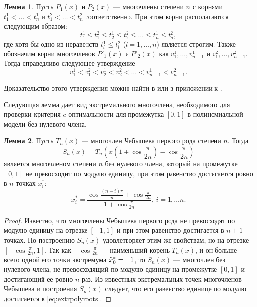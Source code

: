 \documentclass[specialist,
               substylefile = spbu.rtx,
               subf,href,colorlinks=true, 12pt]{disser}
\theoremstyle{definition}
\newtheorem{lemma}{Лемма}
\newcommand{\hm}[1]{#1\nobreak\discretionary{}{\hbox{\ensuremath{#1}}}{}}
\begin{document}
  \begin{lemma}
  \label{lemma:droots}
  	Пусть $P_1(x)$ и $P_2(x)$ --- многочлены степени $n$ с корнями $t^1_1 < \ldots < t^1_n$ и $t^2_1 < \ldots < t^2_n$ соответственно. При этом корни располагаются следующим образом:
  	\begin{equation*}
  		t^1_1 \leqslant t^2_1 \leqslant t^1_2 \leqslant t^2_2 \leqslant \ldots \leqslant t^1_n \leqslant t^2_n,
  	\end{equation*}
  	где хотя бы одно из неравенств $t_l^1 \leqslant t_l^2$ ($l = 1, \ldots, n$) является строгим. Также обозначим корни многочленов $P'_1(x)$ и $P'_2(x)$ как $v_1^1, \ldots, v_{n-1}^1$ и $v_1^2, \ldots, v_{n-1}^2$. Тогда справедливо следующее утверждение
  	\begin{equation*}
  		v^1_1 < v^2_1 < v^1_2 < v^2_2 < \ldots < v^1_{n-1} < v^2_{n-1}.
  	\end{equation*}
  \end{lemma}
  Доказательство этого утверждения можно найти в \cite{sahmphd} или в приложении к \cite{melasmain}.
  
  Следующая лемма дает вид экстремального многочлена, необходимого для проверки критерия $c$-оптимальности для промежутка $[0, 1]$ в полиномиальной модели без нулевого члена.
  
  \begin{lemma}
  \label{lemma:extrpoly}
  Пусть $T_n(x)$ --- многочлен Чебышева первого рода степени $n$. Тогда 
  	\begin{equation}
  	\label{eq:extrpoly}
  		S_n(x) = T_n \left(x \left(1 + \cos \frac{\pi}{2n} \right) - \cos \frac{\pi}{2n} \right)
	\end{equation}   
	является многочленом степени $n$ без нулевого члена, который на промежутке $[0, 1]$ не превосходит по модулю единицу, при этом равенство достигается ровно в $n$ точках $x^*_i$:
	\begin{equation}
	\label{eq:extrpolyroots}
		x_i^* = \frac{\cos \frac{(n - i) \pi}{n} + \cos \frac{\pi}{2n}}{1 + \cos \frac{\pi}{2n}} , \, i = 1, \ldots n.
	\end{equation}
  \end{lemma}
  
  \begin{proof}
  	Известно, что многочлены Чебышева первого рода не превосходят по модулю единицу на отрезке $[-1, 1]$ и при этом равенство достигается в $n+1$ точках. По построению $S_n(x)$ удовлетворяет этим же свойствам, но на отрезке $[-\cos \frac{\pi}{2 n}, 1]$. Так как $-\cos \frac{\pi}{2 n}$ --- наименьший корень $T_n(x)$, и он больше всего одной его точки экстремума $\tilde{x}_0^*\hm{=}-1$, то $S_n(x)$ --- многочлен без нулевого члена, не превосходящий по модулю единицу на промежутке $[0, 1]$ и достигающий ее ровно $n$ раз. Из известных экстремальных точек многочленов Чебышева и построения $S_n(x)$ следует, что его равенство единице по модулю достигается в \eqref{eq:extrpolyroots}.
  \end{proof}
  
\end{document}
